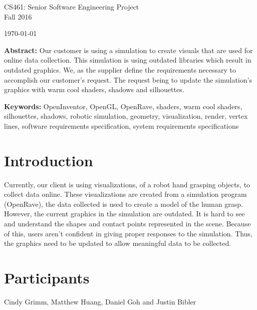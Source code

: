 \documentclass[10pt,journal,compsoc]{IEEEtran}
\begin{document}
\begin{titlepage}
\begin{flushleft}
\begin{bfseries}
\end{bfseries}

\vspace{15mm}
\Large{CS461: Senior Software Engineering Project} \\
\Large{Fall 2016} \\

\vspace{10mm}

\today

\vfill

\begin{normalsize}
{\bf Abstract:}
Our customer is using a simulation to create visuals that are used for online data collection.
This simulation is using outdated libraries which result in outdated graphics.
We, as the supplier define the requirements necessary to accomplish our customer's request.
The request being to update the simulation's graphics with warm cool shaders, shadows and silhouettes.

{\bf Keywords:} OpenInventor, OpenGL, OpenRave, shaders, warm cool shaders, silhouettes, shadows, robotic simulation, geometry, visualization, render,
vertex lines, software requirements specification, system requirements specifications
\end{normalsize}
\end{flushleft}

\newpage

\end{titlepage}

\section*{Introduction}
\vspace{3mm}
Currently, our client is using visualizations, of a robot hand grasping objects, to collect data online.
These visualizations are created from a simulation program (OpenRave), the data collected is used to create a model of the human grasp.
However, the current graphics in the simulation are outdated.
It is hard to see and understand the shapes and contact points represented in the scene.
Because of this, users aren't confident in giving proper responses to the simulation.
Thus, the graphics need to be updated to allow meaningful data to be collected. \\


\section*{Participants}
\vspace{3mm}
Cindy Grimm, Matthew Huang, Daniel Goh and Justin Bibler \\ 
\end{document}
